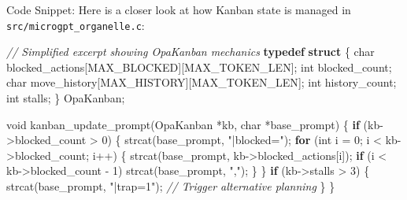 \documentclass[
]{article}
\newenvironment{Shaded}{}{}
\newcommand{\CommentTok}[1]{\textcolor[rgb]{0.38,0.63,0.69}{\textit{#1}}}
\newcommand{\ControlFlowTok}[1]{\textcolor[rgb]{0.00,0.44,0.13}{\textbf{#1}}}
\newcommand{\DataTypeTok}[1]{\textcolor[rgb]{0.56,0.13,0.00}{#1}}
\newcommand{\DecValTok}[1]{\textcolor[rgb]{0.25,0.63,0.44}{#1}}
\newcommand{\KeywordTok}[1]{\textcolor[rgb]{0.00,0.44,0.13}{\textbf{#1}}}
\newcommand{\NormalTok}[1]{#1}
\newcommand{\OperatorTok}[1]{\textcolor[rgb]{0.40,0.40,0.40}{#1}}
\newcommand{\StringTok}[1]{\textcolor[rgb]{0.25,0.44,0.63}{#1}}
\begin{document}
Code Snippet: Here is a closer look at how Kanban state is managed in
\texttt{src/microgpt\_organelle.c}:

\begin{Shaded}
\begin{Highlighting}[]
\CommentTok{// Simplified excerpt showing OpaKanban mechanics}
\KeywordTok{typedef} \KeywordTok{struct} \OperatorTok{\{}
    \DataTypeTok{char}\NormalTok{ blocked\_actions}\OperatorTok{[}\NormalTok{MAX\_BLOCKED}\OperatorTok{][}\NormalTok{MAX\_TOKEN\_LEN}\OperatorTok{];}
    \DataTypeTok{int}\NormalTok{ blocked\_count}\OperatorTok{;}
    \DataTypeTok{char}\NormalTok{ move\_history}\OperatorTok{[}\NormalTok{MAX\_HISTORY}\OperatorTok{][}\NormalTok{MAX\_TOKEN\_LEN}\OperatorTok{];}
    \DataTypeTok{int}\NormalTok{ history\_count}\OperatorTok{;}
    \DataTypeTok{int}\NormalTok{ stalls}\OperatorTok{;}
\OperatorTok{\}}\NormalTok{ OpaKanban}\OperatorTok{;}

\DataTypeTok{void}\NormalTok{ kanban\_update\_prompt}\OperatorTok{(}\NormalTok{OpaKanban }\OperatorTok{*}\NormalTok{kb}\OperatorTok{,} \DataTypeTok{char} \OperatorTok{*}\NormalTok{base\_prompt}\OperatorTok{)} \OperatorTok{\{}
    \ControlFlowTok{if} \OperatorTok{(}\NormalTok{kb}\OperatorTok{{-}\textgreater{}}\NormalTok{blocked\_count }\OperatorTok{\textgreater{}} \DecValTok{0}\OperatorTok{)} \OperatorTok{\{}
\NormalTok{        strcat}\OperatorTok{(}\NormalTok{base\_prompt}\OperatorTok{,} \StringTok{"|blocked="}\OperatorTok{);}
        \ControlFlowTok{for} \OperatorTok{(}\DataTypeTok{int}\NormalTok{ i }\OperatorTok{=} \DecValTok{0}\OperatorTok{;}\NormalTok{ i }\OperatorTok{\textless{}}\NormalTok{ kb}\OperatorTok{{-}\textgreater{}}\NormalTok{blocked\_count}\OperatorTok{;}\NormalTok{ i}\OperatorTok{++)} \OperatorTok{\{}
\NormalTok{            strcat}\OperatorTok{(}\NormalTok{base\_prompt}\OperatorTok{,}\NormalTok{ kb}\OperatorTok{{-}\textgreater{}}\NormalTok{blocked\_actions}\OperatorTok{[}\NormalTok{i}\OperatorTok{]);}
            \ControlFlowTok{if} \OperatorTok{(}\NormalTok{i }\OperatorTok{\textless{}}\NormalTok{ kb}\OperatorTok{{-}\textgreater{}}\NormalTok{blocked\_count }\OperatorTok{{-}} \DecValTok{1}\OperatorTok{)}\NormalTok{ strcat}\OperatorTok{(}\NormalTok{base\_prompt}\OperatorTok{,} \StringTok{","}\OperatorTok{);}
        \OperatorTok{\}}
    \OperatorTok{\}}
    \ControlFlowTok{if} \OperatorTok{(}\NormalTok{kb}\OperatorTok{{-}\textgreater{}}\NormalTok{stalls }\OperatorTok{\textgreater{}} \DecValTok{3}\OperatorTok{)} \OperatorTok{\{}
\NormalTok{        strcat}\OperatorTok{(}\NormalTok{base\_prompt}\OperatorTok{,} \StringTok{"|trap=1"}\OperatorTok{);} \CommentTok{// Trigger alternative planning}
    \OperatorTok{\}}
\OperatorTok{\}}
\end{Highlighting}
\end{Shaded}
\end{document}
